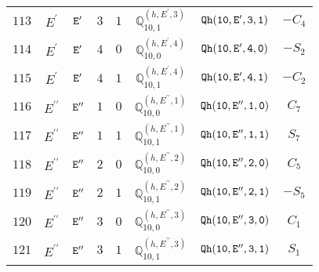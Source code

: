 \documentclass[fleqn,8pt]{jsarticle}
\begin{document}
\begin{table}[ht!]
\begin{center}
\begin{tabular}{cccccccc}
$ 113 $ & $ E^{\prime} $ & $ {\tt E'} $ & $ 3 $ & $ 1 $ & $ \mathbb{Q}_{10,1}^{(h,E^{\prime},3)} $ & $ {\tt Qh(10,E',3,1)} $ & $ - C_{4} $ \\
$ 114 $ & $ E^{\prime} $ & $ {\tt E'} $ & $ 4 $ & $ 0 $ & $ \mathbb{Q}_{10,0}^{(h,E^{\prime},4)} $ & $ {\tt Qh(10,E',4,0)} $ & $ - S_{2} $ \\
$ 115 $ & $ E^{\prime} $ & $ {\tt E'} $ & $ 4 $ & $ 1 $ & $ \mathbb{Q}_{10,1}^{(h,E^{\prime},4)} $ & $ {\tt Qh(10,E',4,1)} $ & $ - C_{2} $ \\
$ 116 $ & $ E^{\prime\prime} $ & $ {\tt E''} $ & $ 1 $ & $ 0 $ & $ \mathbb{Q}_{10,0}^{(h,E^{\prime\prime},1)} $ & $ {\tt Qh(10,E'',1,0)} $ & $ C_{7} $ \\
$ 117 $ & $ E^{\prime\prime} $ & $ {\tt E''} $ & $ 1 $ & $ 1 $ & $ \mathbb{Q}_{10,1}^{(h,E^{\prime\prime},1)} $ & $ {\tt Qh(10,E'',1,1)} $ & $ S_{7} $ \\
$ 118 $ & $ E^{\prime\prime} $ & $ {\tt E''} $ & $ 2 $ & $ 0 $ & $ \mathbb{Q}_{10,0}^{(h,E^{\prime\prime},2)} $ & $ {\tt Qh(10,E'',2,0)} $ & $ C_{5} $ \\
$ 119 $ & $ E^{\prime\prime} $ & $ {\tt E''} $ & $ 2 $ & $ 1 $ & $ \mathbb{Q}_{10,1}^{(h,E^{\prime\prime},2)} $ & $ {\tt Qh(10,E'',2,1)} $ & $ - S_{5} $ \\
$ 120 $ & $ E^{\prime\prime} $ & $ {\tt E''} $ & $ 3 $ & $ 0 $ & $ \mathbb{Q}_{10,0}^{(h,E^{\prime\prime},3)} $ & $ {\tt Qh(10,E'',3,0)} $ & $ C_{1} $ \\
$ 121 $ & $ E^{\prime\prime} $ & $ {\tt E''} $ & $ 3 $ & $ 1 $ & $ \mathbb{Q}_{10,1}^{(h,E^{\prime\prime},3)} $ & $ {\tt Qh(10,E'',3,1)} $ & $ S_{1} $ \\
 \hline \hline
\end{tabular}
\end{center}
\end{table}
\end{document}

